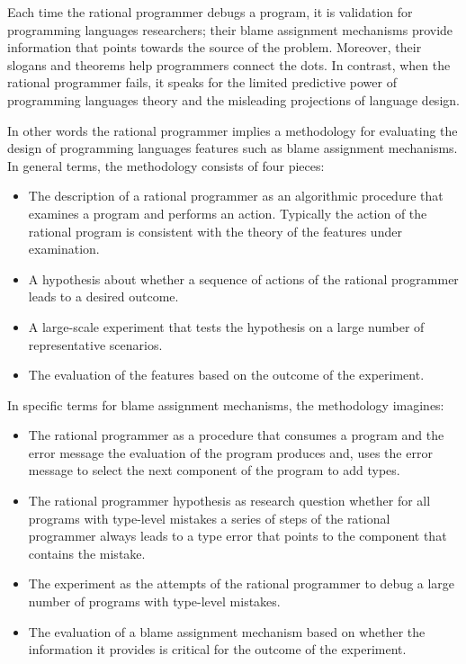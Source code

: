 
Each time the rational programmer debugs a program, it is
validation for programming languages researchers; their blame assignment 
mechanisms provide information that points towards the source of the
problem. Moreover, their slogans and theorems help programmers connect the dots.
In contrast, when the rational programmer fails, it speaks for the
limited predictive power of programming languages theory and the
misleading projections of language design.

In other words the rational programmer implies a methodology for
evaluating
the design of programming languages features such as blame assignment mechanisms. 
In general terms, the methodology consists of four 
pieces:

\begin{itemize} 

\item The description of a  rational programmer as an algorithmic
  procedure that examines a program and performs an action. 
    Typically the action of the rational program is consistent 
   with the theory of the features under examination.

  \item A hypothesis about whether a sequence of actions of the
    rational programmer leads to a desired outcome. 
 
\item A large-scale experiment that tests the hypothesis 
  on a large number of representative scenarios. 


\item The evaluation of the features based on the outcome of the
  experiment.    

\end{itemize}

In specific terms for blame assignment mechanisms, the methodology
imagines:  

\begin{itemize}
\item The rational programmer as a procedure that consumes a program and the error message 
  the evaluation of the program produces and, uses the error message to
    select the next component of the program to add types.

  \item The rational programmer hypothesis as  research question whether 
    for all programs with
    type-level mistakes a series of steps of the rational programmer always leads to a type
    error that points to the component that contains the mistake. 

\item The experiment as the attempts of the rational programmer to debug a
  large number of programs with type-level mistakes. 


\item The evaluation of a blame assignment mechanism based on whether the
  information it provides is critical for the outcome of the experiment.   
\end{itemize}





